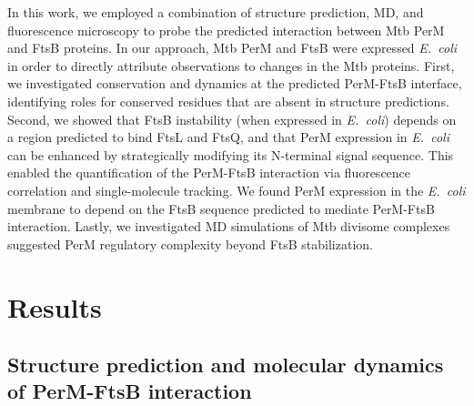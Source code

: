 \documentclass[twocolumn,pdflatex,sn-nature]{sn-jnl}%
\newcommand\ec{\textit{E.~coli}}
\newcommand\mtb{Mtb}
\begin{document}
In this work, we employed a combination of structure prediction, MD, and fluorescence microscopy to probe the predicted interaction between \mtb{} PerM and FtsB proteins.
In our approach, \mtb{} PerM and FtsB were expressed \ec{} in order to directly attribute observations to changes in the \mtb{} proteins.
First, we investigated conservation and dynamics at the predicted PerM-FtsB interface, identifying roles for conserved residues that are absent in structure predictions.
Second, we showed that FtsB instability (when expressed in \ec{}) depends on a region predicted to bind FtsL and FtsQ, and that PerM expression in \ec{} can be enhanced by strategically modifying its N-terminal signal sequence.
This enabled the quantification of the PerM-FtsB interaction via fluorescence correlation and single-molecule tracking.
We found PerM expression in the \ec{} membrane to depend on the FtsB sequence predicted to mediate PerM-FtsB interaction.
Lastly, we investigated MD simulations of \mtb{} divisome complexes suggested PerM regulatory complexity beyond FtsB stabilization.

\section{Results}

\subsection{Structure prediction and molecular dynamics of PerM-FtsB interaction}
\end{document}
